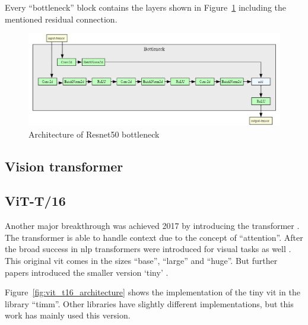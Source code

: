 Every ``bottleneck'' block contains the layers shown in Figure~\ref{fig:resnet50_architecture_bottleneck} including the mentioned residual connection.

\begin{figure}[H]
    \begin{center}
    \includegraphics[width=15cm]{../images/resnet50_architecture_bottleneck.png}
    \caption{Architecture of Resnet50 bottleneck}\label{fig:resnet50_architecture_bottleneck}
    \end{center}
\end{figure}

\newpage

\subsection{Vision transformer}

\subsection{ViT-T/16}
Another major breakthrough was achieved 2017 by introducing the transformer \autocite{vaswani2017}. The transformer is able to handle context due to the concept of ``attention''. After the broad success in \gls{nlp} transformers were introduced for visual tasks as well \autocite{dosovitskiy2020}. This original \gls{vit} comes in the sizes ``base'', ``large'' and ``huge''. But further papers introduced the smaller version `tiny' \autocite{liu2021,wu2022}.

Figure~\ref{fig:vit_t16_architecture} shows the implementation of the tiny \gls{vit} in the library ``timm''. Other libraries have slightly different implementations, but this work has mainly used this version.


